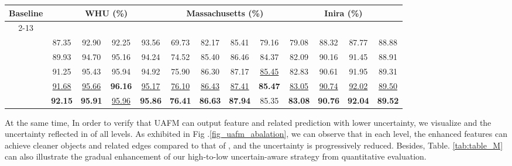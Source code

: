 \documentclass[lettersize,journal]{IEEEtran}
\begin{document}
\begin{table*}[]
\center
\normalsize
\setlength\tabcolsep{3pt}
\caption{The results about  on the test dataset.}
\label{tab:table_M}
\begin{tabular}{c|cccc|cccc|cccc}
\hline
\multirow{2}{*}{Baseline} & \multicolumn{4}{c|}{WHU (\%)}&\multicolumn{4}{c|}{Massachusetts (\%)} &\multicolumn{4}{c}{Inira (\%)}                                             
 \\ \cline{2-13} 
 &  &  &  &  
 &  &  &  & 
 &  &  &  &  \\ \hline
&
87.35  &92.90 &92.25 &93.56
&69.73 &82.17 &85.41 &79.16
&79.08 &88.32 &87.77 &88.88\\
&
89.93 &94.70 &95.16 &94.24
&74.52 &85.40 &86.46 &84.37
&82.09 &90.16 &91.45 &88.91\\ 
 &
91.25 &95.43 &95.94 &94.92
&75.90 &86.30 &87.17 &\underline{85.45}
&82.83 &90.61 &91.95 &89.31\\ 
 &
\underline{91.68} &\underline{95.66} &\color{red}\textbf{96.16} &\underline{95.17}
&\underline{76.10} &\underline{86.43} &\underline{87.41} &\color{red}\textbf{85.47}
&\underline{83.05} &\underline{90.74} &\underline{92.02} &\underline{89.50}\\ 
 &
\color{red}\textbf{92.15} &{\color{red}\textbf{95.91}} &{\underline{95.96}} &\color{red}\textbf{95.86}

& \color{red}\textbf{{76.41}} &\color{red}\textbf{{86.63}} &\color{red}\textbf{87.94} &{85.35}

& {\color{red}\textbf{83.08}} &{\color{red}\textbf{90.76}} &{\color{red}\textbf{92.04}} &{\color{red}\textbf{89.52}}
\\ \hline
\end{tabular}
\vspace{1.0em}
\end{table*}

At the same time, In order to verify that UAFM can output feature  and related prediction  with lower uncertainty, we visualize  and the uncertainty reflected in  of all levels.
As exhibited in Fig .\ref{fig_uafm_abalation}, we can observe that in each level, the enhanced features  can achieve cleaner objects and related edges compared to that of , and the uncertainty is progressively reduced. Besides, Table. \ref{tab:table_M} can also illustrate the gradual enhancement of our high-to-low uncertain-aware strategy from quantitative evaluation.
\end{document}
